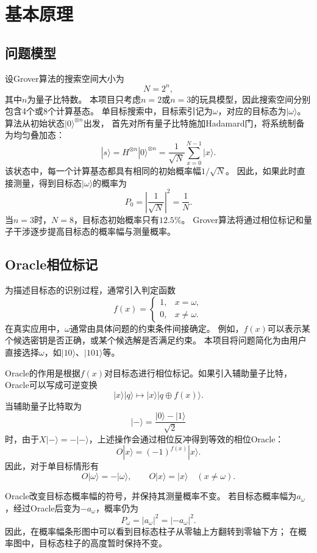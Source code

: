 \section{基本原理}

\subsection{问题模型}

设Grover算法的搜索空间大小为
\[
    N=2^n,
\]
其中\(n\)为量子比特数。
本项目只考虑\(n=2\)或\(n=3\)的玩具模型，因此搜索空间分别包含4个或8个计算基态。
单目标搜索中，目标索引记为\(\omega\)，对应的目标态为\(|\omega\rangle\)。
算法从初始状态\(|0\rangle^{\otimes n}\)出发，
首先对所有量子比特施加Hadamard门，将系统制备为均匀叠加态：
\[
    |s\rangle = H^{\otimes n}|0\rangle^{\otimes n}
    = \frac{1}{\sqrt{N}}\sum_{x=0}^{N-1}|x\rangle.
\]
该状态中，每一个计算基态都具有相同的初始概率幅\(1/\sqrt{N}\)。
因此，如果此时直接测量，得到目标态\(|\omega\rangle\)的概率为
\[
    P_0=\left|\frac{1}{\sqrt{N}}\right|^2=\frac{1}{N}.
\]
当\(n=3\)时，\(N=8\)，目标态初始概率只有\(12.5\%\)。
Grover算法将通过相位标记和量子干涉逐步提高目标态的概率幅与测量概率。

\subsection{Oracle相位标记}

为描述目标态的识别过程，通常引入判定函数
\[
    f(x)=
    \begin{cases}
        1, & x=\omega,    \\
        0, & x\ne \omega.
    \end{cases}
\]
在真实应用中，\(\omega\)通常由具体问题的约束条件间接确定。
例如，\(f(x)\)可以表示某个候选密钥是否正确，或某个候选解是否满足约束。
本项目将问题简化为由用户直接选择\(\omega\)，如\(|10\rangle\)、\(|101\rangle\)等。

Oracle的作用是根据\(f(x)\)对目标态进行相位标记。如果引入辅助量子比特，Oracle可以写成可逆变换
\[
    |x\rangle|q\rangle \mapsto |x\rangle |q\oplus f(x)\rangle.
\]
当辅助量子比特取为
\[
    | - \rangle=\frac{|0\rangle-|1\rangle}{\sqrt{2}}
\]
时，由于\(X| - \rangle=-| - \rangle\)，上述操作会通过相位反冲得到等效的相位Oracle：
\[
    O|x\rangle=(-1)^{f(x)}|x\rangle.
\]
因此，对于单目标情形有
\[
    O|\omega\rangle=-|\omega\rangle,
    \qquad
    O|x\rangle=|x\rangle\quad(x\ne \omega).
\]

Oracle改变目标态概率幅的符号，并保持其测量概率不变。
若目标态概率幅为\(a_\omega\)，经过Oracle后变为\(-a_\omega\)，概率仍为
\[
    P_\omega = |a_\omega|^2 = |-a_\omega|^2.
\]
因此，在概率幅条形图中可以看到目标态柱子从零轴上方翻转到零轴下方；
在概率图中，目标态柱子的高度暂时保持不变。

